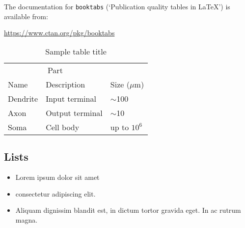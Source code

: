 \documentclass{article}
\begin{document}
The documentation for \verb+booktabs+ (`Publication quality tables in LaTeX') is available from:
\begin{center}
	\url{https://www.ctan.org/pkg/booktabs}
\end{center}


\begin{table}
	\caption{Sample table title}
	\centering
	\begin{tabular}{lll}
		\toprule
		\multicolumn{2}{c}{Part}                   \\
		\cmidrule(r){1-2}
		Name     & Description     & Size ($\mu$m) \\
		\midrule
		Dendrite & Input terminal  & $\sim$100     \\
		Axon     & Output terminal & $\sim$10      \\
		Soma     & Cell body       & up to $10^6$  \\
		\bottomrule
	\end{tabular}
	\label{tab:table}
\end{table}

\subsection{Lists}
\begin{itemize}
	\item Lorem ipsum dolor sit amet
	\item consectetur adipiscing elit.
	\item Aliquam dignissim blandit est, in dictum tortor gravida eget. In ac rutrum magna.
\end{itemize}









\end{document}
